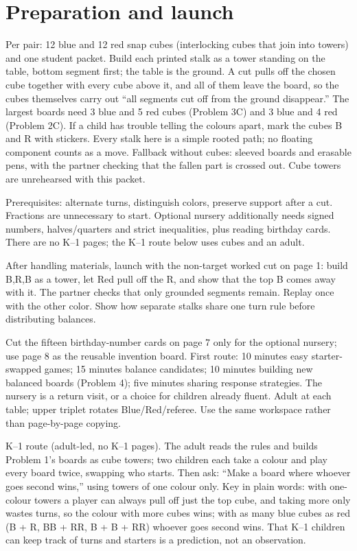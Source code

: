 \documentclass[11pt,letterpaper]{article}
\begin{document}
\section*{Preparation and launch}
Per pair: 12 blue and 12 red snap cubes (interlocking cubes that join into towers) and one student packet. Build each printed stalk as a tower standing on the table, bottom segment first; the table is the ground. A cut pulls off the chosen cube together with every cube above it, and all of them leave the board, so the cubes themselves carry out ``all segments cut off from the ground disappear.'' The largest boards need 3 blue and 5 red cubes (Problem 3C) and 3 blue and 4 red (Problem 2C). If a child has trouble telling the colours apart, mark the cubes B and R with stickers. Every stalk here is a simple rooted path; no floating component counts as a move. Fallback without cubes: sleeved boards and erasable pens, with the partner checking that the fallen part is crossed out. Cube towers are unrehearsed with this packet.

Prerequisites: alternate turns, distinguish colors, preserve support after a cut. Fractions are unnecessary to start. Optional nursery additionally needs signed numbers, halves/quarters and strict inequalities, plus reading birthday cards. There are no K--1 pages; the K--1 route below uses cubes and an adult.

After handling materials, launch with the non-target worked cut on page 1: build B,R,B as a tower, let Red pull off the R, and show that the top B comes away with it. The partner checks that only grounded segments remain. Replay once with the other color. Show how separate stalks share one turn rule before distributing balances.

Cut the fifteen birthday-number cards on page 7 only for the optional nursery; use page 8 as the reusable invention board. First route: 10 minutes easy starter-swapped games; 15 minutes balance candidates; 10 minutes building new balanced boards (Problem 4); five minutes sharing response strategies. The nursery is a return visit, or a choice for children already fluent. Adult at each table; upper triplet rotates Blue/Red/referee. Use the same workspace rather than page-by-page copying.

K--1 route (adult-led, no K--1 pages). The adult reads the rules and builds Problem 1's boards as cube towers; two children each take a colour and play every board twice, swapping who starts. Then ask: ``Make a board where whoever goes second wins,'' using towers of one colour only. Key in plain words: with one-colour towers a player can always pull off just the top cube, and taking more only wastes turns, so the colour with more cubes wins; with as many blue cubes as red (B + R, BB + RR, B + B + RR) whoever goes second wins. That K--1 children can keep track of turns and starters is a prediction, not an observation.
\newpage
\end{document}
